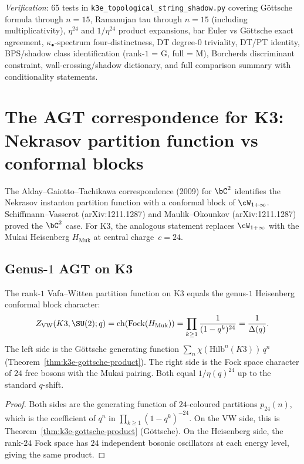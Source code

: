 \noindent\textit{Verification}: 65 tests in \texttt{k3e\_topological\_string\_shadow.py} covering G\"ottsche formula through $n = 15$, Ramanujan tau through $n = 15$ (including multiplicativity), $\eta^{24}$ and $1/\eta^{24}$ product expansions, bar Euler vs G\"ottsche exact agreement, $\kappa_\bullet$-spectrum four-distinctness, DT degree-$0$ triviality, DT/PT identity, BPS/shadow class identification (rank-$1$ = G, full = M), Borcherds discriminant constraint, wall-crossing/shadow dictionary, and full comparison summary with conditionality statements.

\section{The AGT correspondence for K3: Nekrasov partition function vs conformal blocks}
\label{sec:k3e-agt}

The Alday--Gaiotto--Tachikawa correspondence (2009) for $\bC^2$ identifies the Nekrasov instanton partition function with a conformal block of $\cW_{1+\infty}$. Schiffmann--Vasserot (arXiv:1211.1287) and Maulik--Okounkov (arXiv:1211.1287) proved the $\bC^2$ case. For K3, the analogous statement replaces $\cW_{1+\infty}$ with the Mukai Heisenberg $H_{\mathrm{Muk}}$ at central charge~$c = 24$.

\subsection{Genus-$1$ AGT on K3}
\label{subsec:k3e-agt-genus1}

\begin{proposition}
\label{prop:k3e-agt-genus1}
\ClaimStatusProvedHere
The rank-$1$ Vafa--Witten partition function on K3 equals the genus-$1$ Heisenberg conformal block character:
\[
  Z_{\mathrm{VW}}(K3, \SU(2); q)
  = \mathrm{ch}(\mathrm{Fock}(H_{\mathrm{Muk}}))
  = \prod_{k \geq 1} \frac{1}{(1 - q^k)^{24}}
  = \frac{1}{\Delta(q)}.
\]
The left side is the G\"ottsche generating function $\sum_n \chi(\mathrm{Hilb}^n(K3)) \, q^n$ (Theorem~\ref{thm:k3e-gottsche-product}). The right side is the Fock space character of $24$ free bosons with the Mukai pairing. Both equal $1/\eta(q)^{24}$ up to the standard $q$-shift.
\end{proposition}
\begin{proof}
Both sides are the generating function of $24$-coloured partitions $p_{24}(n)$, which is the coefficient of $q^n$ in $\prod_{k \geq 1} (1-q^k)^{-24}$. On the VW side, this is Theorem~\ref{thm:k3e-gottsche-product} (G\"ottsche). On the Heisenberg side, the rank-$24$ Fock space has $24$ independent bosonic oscillators at each energy level, giving the same product.
\end{proof}

